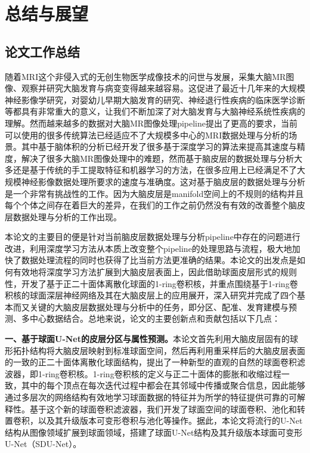 



\chapter{总结与展望}\label{sec:总结与展望}

\section{论文工作总结}
随着MRI这个非侵入式的无创生物医学成像技术的问世与发展，采集大脑MR图像、观察并研究大脑发育与病变变得越来越容易。这促进了最近十几年来的大规模神经影像学研究，对婴幼儿早期大脑发育的研究、神经退行性疾病的临床医学诊断等都具有非常重大的意义，让我们不断加深了对大脑发育与大脑神经系统性疾病的理解。然而越来越多的数据对大脑MR图像处理pipeline提出了更高的要求，当前可以使用的很多传统算法已经适应不了大规模多中心的MRI数据处理与分析的场景。其中基于脑体积的分析已经开发了很多基于深度学习的算法来提高其速度与精度，解决了很多大脑MR图像处理中的难题，然而基于脑皮层的数据处理与分析大多还是基于传统的手工提取特征和机器学习的方法，在很多应用上已经满足不了大规模神经影像数据处理所要求的速度与准确度。这对基于脑皮层的数据处理与分析是一个非常有挑战性的工作。因为大脑皮层是manifold空间上的不规则的结构并且每个个体之间存在着巨大的差异，在我们的工作之前仍然没有有效的改善整个脑皮层数据处理与分析的工作出现。

本论文的主要目的便是针对当前脑皮层数据处理与分析pipeline中存在的问题进行改进，利用深度学习方法从本质上改变整个pipeline的处理思路与流程，极大地加快了数据处理流程的同时也获得了比当前方法更准确的结果。本论文的出发点是如何有效地将深度学习方法扩展到大脑皮层表面上，因此借助球面皮层形式的规则性，开发了基于正二十面体离散化球面的1-ring卷积核，并重点围绕基于1-ring卷积核的球面深层神经网络及其在大脑皮层上的应用展开，深入研究并完成了四个基本而又关键的大脑皮层数据处理与分析中的任务，即分区、配准、发育建模与预测、多中心数据结合。总地来说，论文的主要创新点和贡献包括以下几点：

\textbf{一、基于球面U-Net的皮层分区与属性预测。}本论文首先利用大脑皮层固有的球形拓扑结构将大脑皮层映射到标准球面空间，然后再利用重采样后的大脑皮层表面的一致的正二十面体离散化球面结构，提出了一种新型的直观的自然的球面卷积滤波器，即1-ring卷积核。1-ring卷积核的定义与正二十面体的膨胀和收缩过程一致，其中的每个顶点在每次迭代过程中都会在其邻域中传播或聚合信息，因此能够通过多层次的网络结构有效地学习球面数据的特征并为所学的特征提供可靠的可解释性。基于这个新的球面卷积滤波器，我们开发了球面空间的球面卷积、池化和转置卷积，以及其升级版本可变形卷积与池化等操作。据此，本论文将流行的U-Net结构\cite{ronneberger2015u}从图像领域扩展到球面领域，搭建了球面U-Net结构及其升级版本球面可变形U-Net（SDU-Net）。

